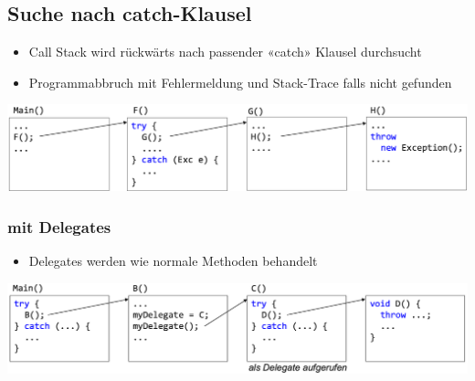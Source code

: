 \subsection{Suche nach catch-Klausel}
\begin{itemize}
    \item Call Stack wird rückwärts nach passender «catch» Klausel durchsucht
    \item Programmabbruch mit Fehlermeldung und Stack-Trace falls nicht gefunden
\end{itemize}
\vspace{-8pt}
\begin{center}
    \includegraphics[scale=.25]{graphic/exceptions/Suche.png}
\end{center}
\vspace{-8pt}

\subsubsection{mit Delegates}
\begin{itemize}
    \item Delegates werden wie normale Methoden behandelt
\end{itemize}
\vspace{-8pt}
\begin{center}
    \includegraphics[scale=.25]{graphic/exceptions/suche delegate.png}
\end{center}
\vspace{-8pt}

